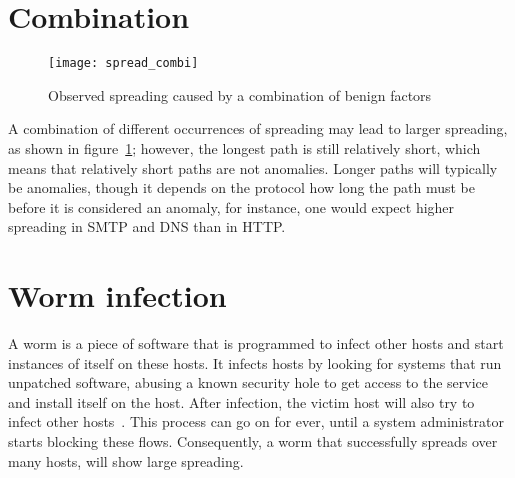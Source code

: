 

\section{Combination}
\begin{figure}[h]
	\caption{Observed spreading caused by a combination of benign factors}
	\label{fig:spread_combi}
	\centering
		\texttt{[image: spread\_combi]}
\end{figure}

A combination of different occurrences of \gls{spreading} may lead to larger \gls{spreading}, as shown in figure~\ref{fig:spread_combi};
however, the longest path is still relatively short, which means that relatively short paths are not anomalies.
Longer paths will typically be anomalies, though it depends on the protocol how long the path must be before it is considered an anomaly,
 for instance, one would expect higher \gls{spreading} in SMTP and DNS than in HTTP.


\section{Worm infection}
A worm is a piece of software that is programmed to infect other hosts and start instances of itself on these hosts.
It infects hosts by looking for systems that run unpatched software,
 abusing a known security hole to get access to the service and install itself on the host.
After infection, the victim host will also try to infect other hosts~\cite{pastor2001epidemic}.
This process can go on for ever, until a system administrator starts blocking these flows.
Consequently, a worm that successfully spreads over many hosts, will show large \gls{spreading}.


